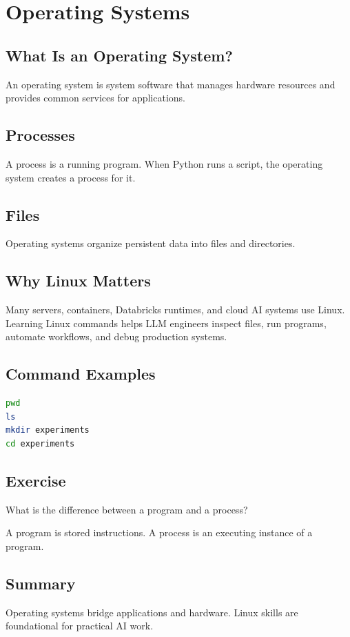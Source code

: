 
\chapter{Operating Systems}
\label{chap:operating-systems}


\section{What Is an Operating System?}
An operating system is system software that manages hardware resources and provides common services for applications.

\section{Processes}
A process is a running program. When Python runs a script, the operating system creates a process for it.

\section{Files}
Operating systems organize persistent data into files and directories.

\section{Why Linux Matters}
Many servers, containers, Databricks runtimes, and cloud AI systems use Linux. Learning Linux commands helps LLM engineers inspect files, run programs, automate workflows, and debug production systems.

\section{Command Examples}
\begin{lstlisting}[language=bash]
pwd
ls
mkdir experiments
cd experiments
\end{lstlisting}

\section{Exercise}
\begin{exercise}What is the difference between a program and a process?\end{exercise}
\begin{solution}A program is stored instructions. A process is an executing instance of a program.\end{solution}

\section{Summary}
Operating systems bridge applications and hardware. Linux skills are foundational for practical AI work.
